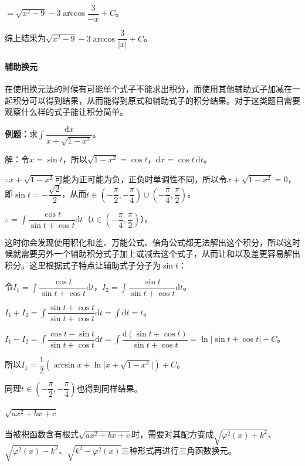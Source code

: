 \documentclass[UTF8, 12pt]{ctexart}
\begin{document}
$=\sqrt{x^2-9}-3\arccos\dfrac{3}{-x}+C$。

综上结果为$\sqrt{x^2-9}-3\arccos\dfrac{3}{\vert x\vert}+C$。

\paragraph{辅助换元} \leavevmode \medskip

在使用换元法的时候有可能单个式子不能求出积分，而使用其他辅助式子加减在一起积分可以得到结果，从而能得到原式和辅助式子的积分结果。对于这类题目需要观察什么样的式子能让积分简单。

\textbf{例题：}求$\displaystyle{\int\dfrac{\textrm{d}x}{x+\sqrt{1-x^2}}}$。\medskip

解：令$x=\sin t$，所以$\sqrt{1-x^2}=\cos t$，$\textrm{d}x=\cos t\,\textrm{d}t$。

$\because x+\sqrt{1-x^2}$可能为正可能为负，正负时单调性不同，所以令$ x+\sqrt{1-x^2}=0$，即$\sin t=-\dfrac{\sqrt{2}}{2}$，从而$t\in(-\dfrac{\pi}{2},-\dfrac{\pi}{4})\cup(-\dfrac{\pi}{4},\dfrac{\pi}{2})$。

$\therefore=\displaystyle{\int\dfrac{\cos t}{\sin t+\cos t}\textrm{d}t}$（$t\in(-\dfrac{\pi}{4},\dfrac{\pi}{2})$）。 \medskip

这时你会发现使用积化和差、万能公式、倍角公式都无法解出这个积分，所以这时候就需要另外一个辅助积分式子加上或减去这个式子，从而让和以及差更容易解出积分。这里根据式子特点让辅助式子分子为$\sin t$：

令$I_1=\displaystyle{\int\dfrac{\cos t}{\sin t+\cos t}\textrm{d}t}$，$I_2=\displaystyle{\int\dfrac{\sin t}{\sin t+\cos t}\textrm{d}t}$。

$I_1+I_2=\displaystyle{\int\dfrac{\sin t+\cos t}{\sin t+\cos t}\textrm{d}t=\int\textrm{d}t=t}$。

$I_1-I_2=\displaystyle{\int\dfrac{\cos t-\sin t}{\sin t+\cos t}\textrm{d}t=\int\dfrac{\textrm{d}(\sin t+\cos t)}{\sin t+\cos t}}=\ln\vert\sin t+\cos t\vert +C$。

所以$I_1=\dfrac{1}{2}(\arcsin x+\ln\vert x+\sqrt{1-x^2}\vert)+C$。

同理$t\in(-\dfrac{\pi}{2},-\dfrac{\pi}{4})$也得到同样结果。

\paragraph{\texorpdfstring{$\sqrt{ax^2+bx+c}$}\ } \leavevmode \medskip

当被积函数含有根式$\sqrt{ax^2+bx+c}$时，需要对其配方变成$\sqrt{\varphi^2(x)+k^2}$、$\sqrt{\varphi^2(x)-k^2}$、$\sqrt{k^2-\varphi^2(x)}$三种形式再进行三角函数换元。
\end{document}
